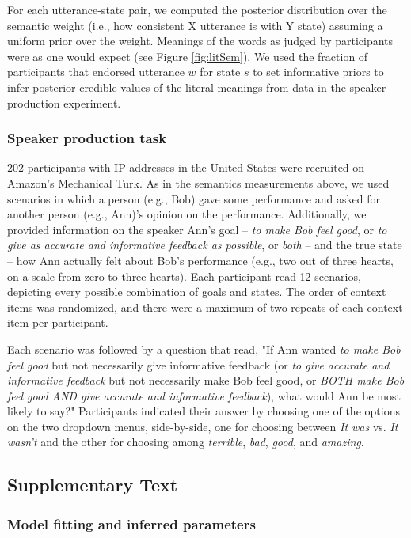 \documentclass[12pt]{article}
\begin{document}
For each utterance-state pair, we computed the posterior distribution over the semantic weight 
(i.e., how consistent X utterance is with Y state) assuming a uniform prior over the weight.
Meanings of the words as judged by participants were as one would expect (see Figure \ref{fig:litSem}). 
We used the fraction of participants that endorsed utterance $w$ for state $s$ to set informative priors to infer posterior credible values of the literal meanings from data in the speaker production experiment.

\subsubsection*{Speaker production task}

202 participants with IP addresses in the United States were recruited on Amazon's Mechanical Turk.
As in the semantics measurements above, we used scenarios in which a person (e.g., Bob) gave some performance and asked for another person (e.g., Ann)'s opinion on the performance. 
Additionally, we provided information on the speaker Ann's goal -- \emph{to make Bob feel good}, or \emph{to give as accurate and informative feedback as possible}, or \emph{both} -- 
and the true state -- how Ann actually felt about Bob's performance (e.g., two out of three hearts, on a scale from zero to three hearts). 
Each participant read 12 scenarios, depicting every possible combination of goals and states. 
The order of context items was randomized, and there were a maximum of two repeats of each context item per participant.

Each scenario was followed by a question that read, "If Ann wanted \emph{to make Bob feel good} but not necessarily give informative feedback (or \emph{to give accurate and informative feedback} but not necessarily make Bob feel good, or \emph{BOTH make Bob feel good AND give accurate and informative feedback}), what would Ann be most likely to say?" Participants indicated their answer by choosing one of the options on the two dropdown menus, side-by-side, one for choosing between \emph{It was} vs. \emph{It wasn't} and the other for choosing among \emph{terrible}, \emph{bad}, \emph{good}, and \emph{amazing}.

\subsection*{Supplementary Text}

\subsubsection*{Model fitting and inferred parameters}
\end{document}
